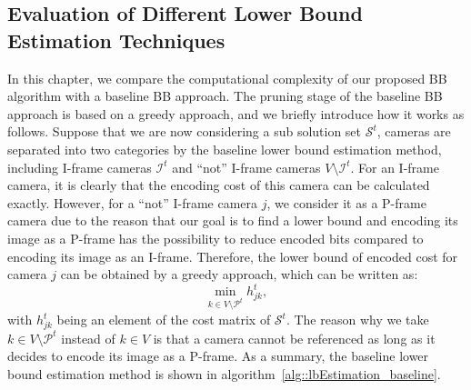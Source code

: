 \subsection{Evaluation of Different Lower Bound Estimation Techniques}
%
In this chapter, we compare the computational complexity of our proposed BB algorithm with a baseline BB approach.
The pruning stage of the baseline BB approach is based on a greedy approach, and we briefly introduce how it works as follows.
Suppose that we are now considering a sub solution set $\mathcal{S}^t$, cameras are separated into two categories by the baseline lower bound estimation method, including I-frame cameras $\mathcal{I}^t$ and ``not'' I-frame cameras $V \setminus \mathcal{I}^t$.
For an I-frame camera, it is clearly that the encoding cost of this camera can be calculated exactly.
However, for a ``not'' I-frame camera $j$, we consider it as a P-frame camera due to the reason that our goal is to find a lower bound and encoding its image as a P-frame has the possibility to reduce encoded bits compared to encoding its image as an I-frame.
Therefore, the lower bound of encoded cost for camera $j$ can be obtained by a greedy approach, which can be written as:
\begin{equation}
\underset{k \in V \setminus \mathcal{P}^t}{\min} h_{jk}^t,
\label{eq::lbGreedy}
\end{equation}
with $h_{jk}^t$ being an element of the cost matrix of $\mathcal{S}^t$.
The reason why we take $k \in V \setminus \mathcal{P}^t$ instead of $k \in V$ is that a camera cannot be referenced as long as it decides to encode its image as a P-frame.
As a summary, the baseline lower bound estimation method is shown in algorithm~\ref{alg::lbEstimation_baseline}.
%
\IncMargin{1em}
